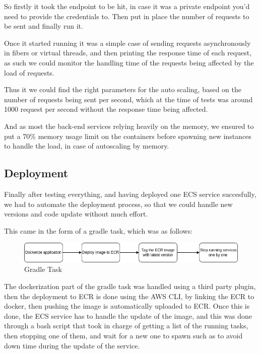 So firstly it took the endpoint to be hit, in case it was a private endpoint you'd need to
provide the credentials to. Then put in place the number of requests to be sent and
finally run it.

Once it started running it was a simple case of sending requests asynchronously in fibers
or virtual threads, and then printing the response time of each request, as such we could
monitor the handling time of the requests being affected by the load of requests.

Thus it we could find the right parameters for the auto scaling, based on the number of
requests being sent per second, which at the time of tests was around 1000 request per
second without the response time being affected.

And as most the back-end services relying heavily on the memory, we ensured to put a 70\%
memory usage limit on the containers before spawning new instances to handle the load, in
case of autoscaling by memory.

\subsection{Deployment}

Finally after testing everything, and having deployed one ECS service succesfully, we had
to automate the deployment process, so that we could handle new versions and code update
without much effort.

This came in the form of a gradle task, which was as follows:

    \begin{figure}[!htbp]
        \centering
        \includegraphics[width=\textwidth]{images/gradle.png}
        \caption{\footnotesize{Gradle Task}}
        \label{fig:gradle}
    \end{figure}

The dockerization part of the gradle task was handled using a third party plugin,
then the deployment to ECR is done using the AWS CLI, by linking the ECR to docker,
then pushing the image is automatically uploaded to ECR.
Once this is done, the ECS service has to handle the update of the image, 
and this was done through a bash script that took in charge of getting a list 
of the running tasks, then stopping one of them, and wait for a new one to spawn 
such as to avoid down time during the update of the service.


